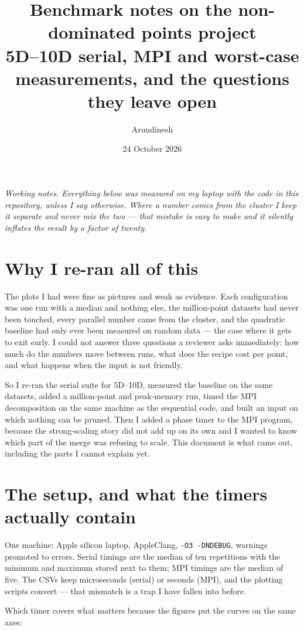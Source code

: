 \documentclass[11pt,a4paper]{article}
\title{\bfseries Benchmark notes on the non-dominated points project\\
\large 5D--10D serial, MPI and worst-case measurements, and the questions
they leave open}
\author{Arundinesh}
\date{24 October 2026}
\newcommand{\code}[1]{\texttt{#1}}
\begin{document}
\maketitle

\noindent\textit{Working notes. Everything below was measured on my laptop with
the code in this repository, unless I say otherwise. Where a number comes from
the cluster I keep it separate and never mix the two --- that mistake is easy to
make and it silently inflates the result by a factor of twenty.}

\section{Why I re-ran all of this}

The plots I had were fine as pictures and weak as evidence. Each configuration
was one run with a median and nothing else, the million-point datasets had never
been touched, every parallel number came from the cluster, and the quadratic
baseline had only ever been measured on random data --- the case where it gets
to exit early. I could not answer three questions a reviewer asks immediately:
how much do the numbers move between runs, what does the recipe cost per point,
and what happens when the input is not friendly.

So I re-ran the serial suite for 5D--10D, measured the baseline on the same
datasets, added a million-point and peak-memory run, timed the MPI decomposition
on the same machine as the sequential code, and built an input on which nothing
can be pruned. Then I added a phase timer to the MPI program, because the
strong-scaling story did not add up on its own and I wanted to know which part
of the merge was refusing to scale. This document is what came out, including
the parts I cannot explain yet.

\section{The setup, and what the timers actually contain}

One machine: Apple silicon laptop, AppleClang, \code{-O3 -DNDEBUG}, warnings
promoted to errors. Serial timings are the median of ten repetitions with the
minimum and maximum stored next to them; MPI timings are the median of five.
The CSVs keep microseconds (serial) or seconds (MPI), and the plotting scripts
convert --- that mismatch is a trap I have fallen into before.

Which timer covers what matters because the figures put the curves on the same
axes:
\end{document}
